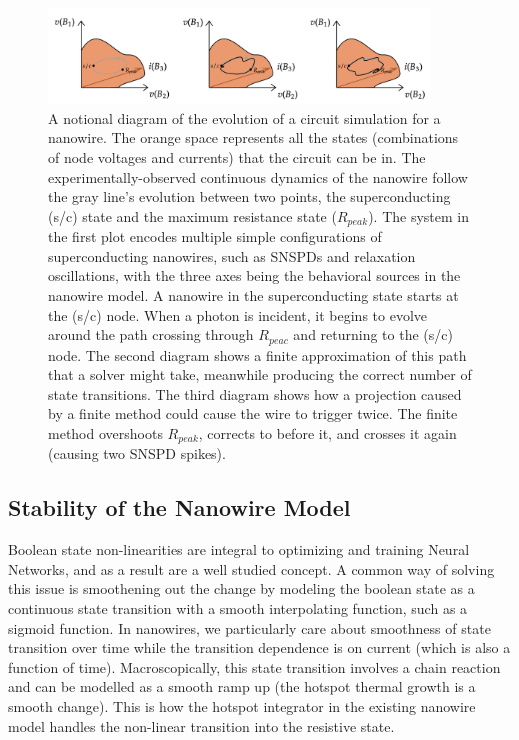 \begin{figure}
    \centering
    \includegraphics[width=0.9\textwidth]{figs/statespaceevolution.png}
    \caption{A notional diagram of the evolution of a circuit simulation for a nanowire.
    The orange space represents all the states (combinations of node voltages and currents) 
    that the circuit can be in. The experimentally-observed continuous dynamics of the nanowire follow
    the gray line's evolution between two points, the superconducting (s/c) state and the maximum resistance
    state ($R_{peak}$). The system in the first plot encodes multiple simple configurations of superconducting nanowires, such as SNSPDs and relaxation oscillations, with the three axes being the behavioral sources in the nanowire model. A nanowire in the superconducting state starts at the (s/c) node. When a photon is incident, it begins to evolve around the path crossing through $R_{peac}$ and
    returning to the (s/c) node. The second diagram shows a finite approximation of this path that a solver
    might take, meanwhile producing the correct number of state transitions. The third diagram shows
    how a projection caused by a finite method could cause the wire to trigger twice. The finite method
    overshoots $R_{peak}$, corrects to before it, and crosses it again (causing two SNSPD spikes).}
    \label{fig:statespaceevolution}
\end{figure}

\subsection{Stability of the Nanowire Model} 

Boolean state non-linearities are integral to optimizing and training Neural Networks, and as a 
result are a well studied concept. A common way of solving this issue is smoothening out the 
change by modeling the boolean state as a continuous state transition with a smooth interpolating
function, such as a sigmoid function. In nanowires, we particularly care about smoothness of state
transition over time while the transition dependence is on current (which is also a function of time).
Macroscopically, this state transition involves a chain reaction and can be modelled as a smooth
ramp up (the hotspot thermal growth is a smooth change). This is how the hotspot integrator in the 
existing nanowire model handles the non-linear transition into the resistive state.

